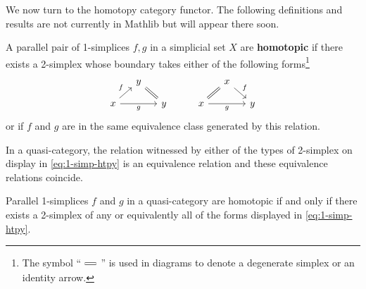  We now turn to the homotopy category functor. The following definitions and results are not currently in Mathlib but will appear there soon.

 \begin{defn}
   A parallel pair of 1-sim\-plices $f,g$ in a simplicial set $X$ are \textbf{homotopic} if there exists a 2-simplex whose boundary takes either of the following forms\footnote{The symbol ``$\!\!\!\!\!\begin{tikzcd}[ampersand replacement=\&, sep=small] ~\arrow[r, equals] \& ~ \end{tikzcd}\!\!\!\!\!$'' is used in diagrams to denote a degenerate simplex or an identity arrow.}
   \begin{equation}\label{eq:1-simp-htpy}
   \begin{tikzcd}[row sep=small, column sep=small]
   & y \arrow[dr, equals] & && &  x \arrow[dr, "f"]  \\ x \arrow[ur, "f"] \arrow[rr, "g"'] & & y & & x \arrow[ur, equals] \arrow[rr, "g"'] & & y
   \end{tikzcd}
   \end{equation}
   or if $f$ and $g$ are in the same equivalence class generated by this relation.
   \end{defn}

   In a quasi-category, the relation witnessed by either of the types of 2-simplex on display in \eqref{eq:1-simp-htpy} is an equivalence relation and these equivalence relations coincide.

   \begin{lem}\label{lem:1-simp-htpy} Parallel 1-sim\-plices $f$ and $g$ in a quasi-category are homotopic if and only if there exists a 2-simplex of any or equivalently all of the forms displayed in \eqref{eq:1-simp-htpy}.
   \end{lem}


